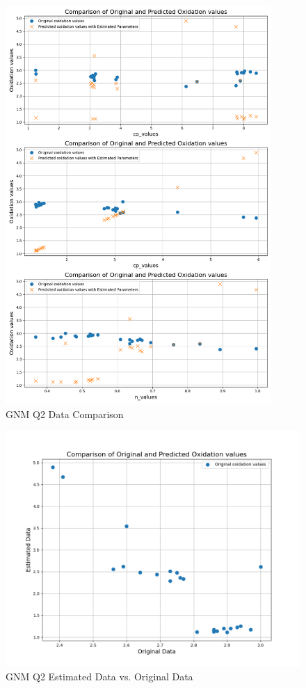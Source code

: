 \documentclass[a4paper,12pt]{article} %
\begin{document}
\begin{figure}[ht]
    \centering
    \includegraphics[width=0.9\textwidth]{GNM_Q2_ParamComp.png}
    \caption{GNM Q2 Data Comparison }
\end{figure}

\begin{figure}[ht]
    \centering
    \includegraphics[width=1\textwidth]{GNM_Q2_ParamComp_1.png}
    \caption{GNM Q2 Estimated Data vs. Original Data}
\end{figure}
\end{document}
